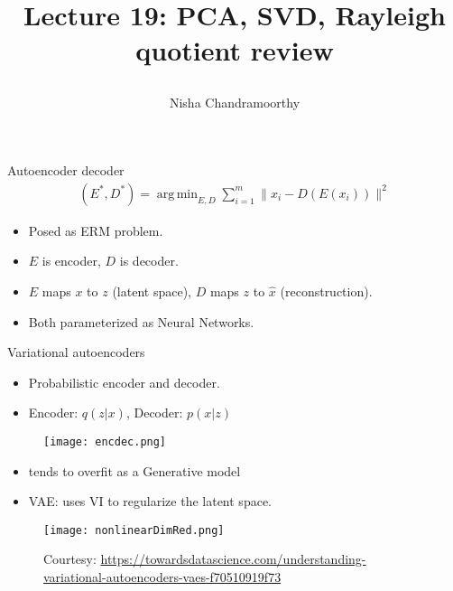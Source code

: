 \documentclass[final]{beamer}
\title{\begin{huge}{Lecture 19: PCA, SVD, Rayleigh quotient review}\end{huge}} %
\author{Nisha Chandramoorthy} %
\DeclareMathOperator*{\argmin}{arg\,min}
\begin{document}
\frame{\titlepage}

\begin{frame}{Autoencoder decoder}
	\begin{align}
		(E^*, D^*) = \argmin_{E, D} \sum_{i=1}^m \|x_i - D(E(x_i))\|^2
	\end{align}
	\begin{itemize}
	\item Posed as ERM problem.
	\pause
	\item $E$ is encoder, $D$ is decoder. 
	\pause
\item $E$ maps $x$ to $z$ (latent space), $D$ maps $z$ to $\hat{x}$ (reconstruction).
	\pause
\item Both parameterized as Neural Networks.
	\end{itemize}
\end{frame}
\begin{frame}{Variational autoencoders}
	\begin{itemize}
	\item Probabilistic encoder and decoder.
	\pause
	\item Encoder: $q(z|x)$, Decoder: $p(x|z)$
	\end{itemize}

\end{frame}
\begin{frame}
	\begin{figure}
		\texttt{[image: encdec.png]}
	\end{figure}
	\begin{itemize}
		\item tends to overfit as a Generative model
		\pause
		\item VAE: uses VI to regularize the latent space.
	\end{itemize}
\end{frame}
\begin{frame}
\begin{figure}
	\texttt{[image: nonlinearDimRed.png]}
	\caption{Courtesy: \url{https://towardsdatascience.com/understanding-variational-autoencoders-vaes-f70510919f73}}
\end{figure}
\end{frame}
\end{document}

